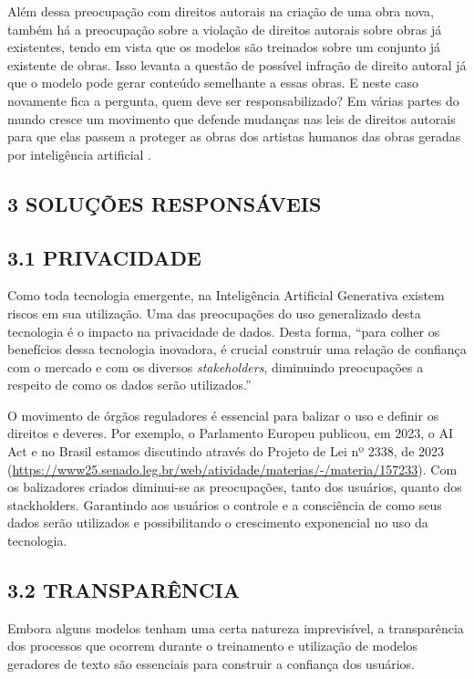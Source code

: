 Além dessa preocupação com direitos autorais na criação de uma obra nova, também há a preocupação sobre a violação de direitos autorais sobre obras já existentes, tendo em vista que os modelos são treinados sobre um conjunto já existente de obras. Isso levanta a questão de possível infração de direito autoral já que o modelo pode gerar conteúdo semelhante a essas obras. E neste caso novamente fica a pergunta, quem deve ser responsabilizado? Em várias partes do mundo cresce um movimento que defende mudanças nas leis de direitos autorais para que elas passem a proteger as obras dos artistas humanos das obras geradas por inteligência artificial \cite{prado2023}. 


\subsection*{\textbf{3 SOLUÇÕES RESPONSÁVEIS}}
\subsection*{{3.1 PRIVACIDADE}}
Como toda tecnologia emergente, na Inteligência Artificial Generativa existem riscos em sua utilização. Uma das preocupações do uso generalizado desta tecnologia é o impacto na privacidade de dados. Desta forma, “para colher os benefícios dessa tecnologia inovadora, é crucial construir uma relação de confiança com o mercado e com os diversos \textit{stakeholders}, diminuindo preocupações a respeito de como os dados serão utilizados.” \cite{kpmg2024}

O movimento de órgãos reguladores é essencial para balizar o uso e definir os direitos e deveres. Por exemplo, o Parlamento Europeu publicou, em 2023, o AI Act e no Brasil estamos discutindo através do Projeto de Lei nº 2338, de 2023 (\url{https://www25.senado.leg.br/web/atividade/materias/-/materia/157233}). Com os balizadores criados diminui-se as preocupações, tanto dos usuários, quanto dos stackholders. Garantindo aos usuários o controle e a consciência de como seus dados serão utilizados e possibilitando o crescimento exponencial no uso da tecnologia. 

\subsection*{{3.2 TRANSPARÊNCIA}}
Embora alguns modelos tenham uma certa natureza imprevisível, a transparência dos processos que ocorrem durante o treinamento e utilização de modelos geradores de texto são essenciais para construir a confiança dos usuários. 

